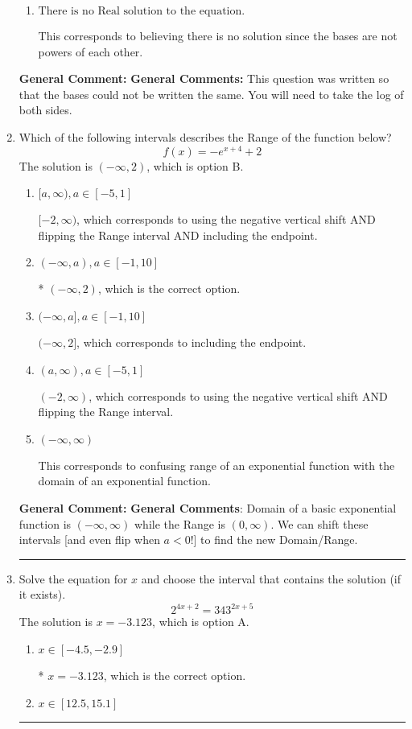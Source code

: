 \documentclass{extbook}[14pt]
\newcommand{\litem}[1]{\item #1

\rule{\textwidth}{0.4pt}}
\begin{document}
\begin{enumerate}
{\begin{enumerate}[label=\Alph*.]
$x = -1.833$, which corresponds to distributing the $\ln(base)$ to the first term of the exponent only.
\item \( \text{There is no Real solution to the equation.} \)

This corresponds to believing there is no solution since the bases are not powers of each other.
\end{enumerate}

\textbf{General Comment:} \textbf{General Comments:} This question was written so that the bases could not be written the same. You will need to take the log of both sides.
}
\litem{
Which of the following intervals describes the Range of the function below?
\[ f(x) = -e^{x+4}+2 \]The solution is \( (-\infty, 2) \), which is option B.\begin{enumerate}[label=\Alph*.]
\item \( [a, \infty), a \in [-5, 1] \)

$[-2, \infty)$, which corresponds to using the negative vertical shift AND flipping the Range interval AND including the endpoint.
\item \( (-\infty, a), a \in [-1, 10] \)

* $(-\infty, 2)$, which is the correct option.
\item \( (-\infty, a], a \in [-1, 10] \)

$(-\infty, 2]$, which corresponds to including the endpoint.
\item \( (a, \infty), a \in [-5, 1] \)

$(-2, \infty)$, which corresponds to using the negative vertical shift AND flipping the Range interval.
\item \( (-\infty, \infty) \)

This corresponds to confusing range of an exponential function with the domain of an exponential function.
\end{enumerate}

\textbf{General Comment:} \textbf{General Comments}: Domain of a basic exponential function is $(-\infty, \infty)$ while the Range is $(0, \infty)$. We can shift these intervals [and even flip when $a<0$!] to find the new Domain/Range.
}
\litem{
Solve the equation for $x$ and choose the interval that contains the solution (if it exists).
\[ 2^{4x+2} = 343^{2x+5} \]The solution is \( x = -3.123 \), which is option A.\begin{enumerate}[label=\Alph*.]
\item \( x \in [-4.5, -2.9] \)

* $x = -3.123$, which is the correct option.
\item \( x \in [12.5, 15.1] \)


\end{enumerate}}
\end{enumerate}
\end{document}
